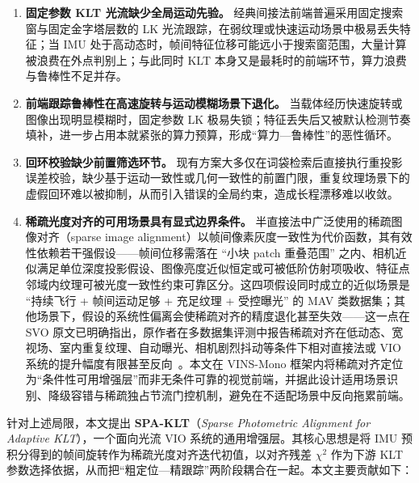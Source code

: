 \documentclass[letterpaper,journal]{IEEEtran}
\begin{document}
\begin{enumerate}
\item \textbf{固定参数 KLT 光流缺少全局运动先验。} 经典间接法前端普遍采用固定搜索窗与固定金字塔层数的 LK 光流跟踪，在弱纹理或快速运动场景中极易丢失特征；当 IMU 处于高动态时，帧间特征位移可能远小于搜索窗范围，大量计算被浪费在外点判别上；与此同时 KLT 本身又是最耗时的前端环节，算力浪费与鲁棒性不足并存。
\item \textbf{前端跟踪鲁棒性在高速旋转与运动模糊场景下退化。} 当载体经历快速旋转或图像出现明显模糊时，固定参数 LK 极易失锁；特征丢失后又被默认检测节奏填补，进一步占用本就紧张的算力预算，形成``算力—鲁棒性''的恶性循环。
\item \textbf{回环校验缺少前置筛选环节。} 现有方案大多仅在词袋检索后直接执行重投影误差校验，缺少基于运动一致性或几何一致性的前置门限，重复纹理场景下的虚假回环难以被抑制，从而引入错误的全局约束，造成长程漂移难以收敛。
\item \textbf{稀疏光度对齐的可用场景具有显式边界条件。} 半直接法中广泛使用的稀疏图像对齐（sparse image alignment）以帧间像素灰度一致性为代价函数，其有效性依赖若干强假设——帧间位移需落在 ``小块 patch 重叠范围'' 之内、相机近似满足单位深度投影假设、图像亮度近似恒定或可被低阶仿射项吸收、特征点邻域内纹理可被光度一致性约束可靠区分。这四项假设同时成立的近似场景是 ``持续飞行 + 帧间运动足够 + 充足纹理 + 受控曝光'' 的 MAV 类数据集；其他场景下，假设的系统性偏离会使稀疏对齐的精度退化甚至失效——这一点在 SVO 原文已明确指出，原作者在多数据集评测中报告稀疏对齐在低动态、宽视场、室内重复纹理、自动曝光、相机剧烈抖动等条件下相对直接法或 VIO 系统的提升幅度有限甚至反向~\cite{forster2017svo}。本文在 VINS-Mono 框架内将稀疏对齐定位为``条件性可用增强层''而非无条件可靠的视觉前端，并据此设计适用场景识别、降级容错与稀疏独占节流门控机制，避免在不适配场景中反向拖累前端。
\end{enumerate}

针对上述局限，本文提出 \textbf{SPA-KLT}（\textit{Sparse Photometric Alignment for Adaptive KLT}），一个面向光流 VIO 系统的通用增强层。其核心思想是将 IMU 预积分得到的帧间旋转作为稀疏光度对齐迭代初值，以对齐残差 $\chi^2$ 作为下游 KLT 参数选择依据，从而把``粗定位—精跟踪''两阶段耦合在一起。本文主要贡献如下：
\end{document}
